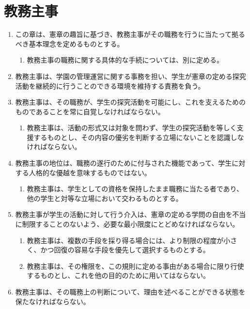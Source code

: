 \newpage
\chapter{教務主事}
\begin{enumerate}[label=第\arabic*条　]
  \item この章は、憲章の趣旨に基づき、教務主事がその職務を行うに当たって拠るべき基本理念を定めるものとする。
    \begin{enumerate}[label=\arabic*　,start=2,leftmargin=*]
      \item 教務主事の職務に関する具体的な手続については、別に定める。
    \end{enumerate}
  \item 教務主事は、学園の管理運営に関する事務を担い、学生が憲章の定める探究活動を継続的に行うことのできる環境を維持する責務を負う。
  \item 教務主事は、その職務が、学生の探究活動を可能にし、これを支えるためのものであることを常に自覚しなければならない。
    \begin{enumerate}[label=\arabic*　,start=2,leftmargin=*]
      \item 教務主事は、活動の形式又は対象を問わず、学生の探究活動を等しく支援するものとし、その内容の優劣を判断する立場にないことを認識しなければならない。
    \end{enumerate}
  \item 教務主事の地位は、職務の遂行のために付与された機能であって、学生に対する人格的な優越を意味するものではない。
    \begin{enumerate}[label=\arabic*　,start=2,leftmargin=*]
      \item 教務主事は、学生としての資格を保持したまま職務に当たる者であり、他の学生と対等な立場において交わるものとする。
    \end{enumerate}
  \item 教務主事が学生の活動に対して行う介入は、憲章の定める学問の自由を不当に制限することのないよう、必要な最小限度にとどめなければならない。
    \begin{enumerate}[label=\arabic*　,start=2,leftmargin=*]
      \item 教務主事は、複数の手段を採り得る場合には、より制限の程度が小さく、かつ回復の容易な手段を優先して選択するものとする。
      \item 教務主事は、その権限を、この規則に定める事由がある場合に限り行使するものとし、これを他の目的のために用いてはならない。
    \end{enumerate}
  \item 教務主事は、その職務上の判断について、理由を述べることができる状態を保たなければならない。

\end{enumerate}
